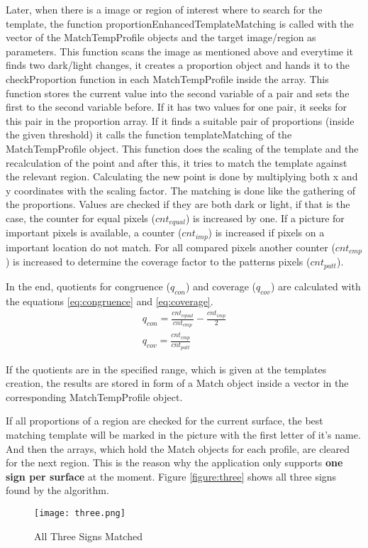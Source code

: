 Later, when there is a image or region of interest where to search for the template, the function
proportionEnhancedTemplateMatching is called with the vector of the MatchTempProfile objects and the target 
image/region as parameters. This function scans the image as mentioned above and everytime it finds two dark/light 
changes, it creates a proportion object and hands it to the checkProportion function in each MatchTempProfile inside 
the array. This function stores the current value into the second variable of a pair and sets the first to
the second variable before. If it has two values for one pair, it seeks  
for this pair in the proportion array. If it finds a suitable pair of proportions (inside the given threshold) 
it calls the function templateMatching of the MatchTempProfile object.
This function does the scaling of the template and the recalculation of the point and after this,
it tries to match the template against the relevant region. Calculating the new point is
done by multiplying both x and y coordinates with the scaling factor. The matching is done like
the gathering of the proportions. Values are checked if they are both dark or light, if that
is the case, the counter for equal pixels ($cnt_{equal}$) is increased by one. If a picture for important pixels
is available, a counter ($cnt_{imp}$) is increased if pixels on a important location do not match. For all compared
pixels another counter ($cnt_{cmp}$) is increased to determine the coverage factor to the patterns pixels ($cnt_{patt}$).

In the end, quotients for  congruence ($q_{con}$) and coverage ($q_{cov}$) are calculated with the equations
\ref{eq:congruence} and \vref{eq:coverage}.
\begin{gather}
	q_{con} =\frac{cnt_{equal}}{cnt_{cmp}}-\frac{cnt_{imp}}{2} \label{eq:congruence}\\
	q_{cov} = \frac{cnt_{cmp}}{cnt_{patt}}\label{eq:coverage}
\end{gather}

If the quotients are in the specified range, which is given at the templates creation, the results 
are stored in form of a Match object inside a vector in the corresponding MatchTempProfile object.

If all proportions of a region are checked for the current surface, the best matching template will
be marked in the picture with the first letter of it's name. And then the arrays,
which hold the Match objects for each profile, are cleared for the next region. This is the reason 
why the application only supports \textbf{one sign per surface} at the moment.
Figure \vref{figure:three} shows all three signs found by the algorithm.

\begin{figure}[H]
\begin{center}
  \texttt{[image: three.png]}
  \caption[]{All Three Signs Matched}
  \label{figure:three}
\end{center}
\end{figure}


